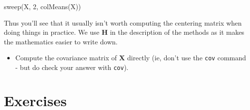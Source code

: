 \documentclass[
]{book}
\newenvironment{Shaded}{\begin{snugshade}}{\end{snugshade}}
\newcommand{\DecValTok}[1]{\textcolor[rgb]{0.00,0.00,0.81}{#1}}
\newcommand{\FunctionTok}[1]{\textcolor[rgb]{0.00,0.00,0.00}{#1}}
\newcommand{\NormalTok}[1]{#1}
\providecommand{\tightlist}{%
  \setlength{\itemsep}{0pt}\setlength{\parskip}{0pt}}
\theoremstyle{definition}
\theoremstyle{definition}
\theoremstyle{definition}
\theoremstyle{definition}
\theoremstyle{remark}
\begin{document}
\begin{Shaded}
\begin{Highlighting}[]
\FunctionTok{sweep}\NormalTok{(X, }\DecValTok{2}\NormalTok{, }\FunctionTok{colMeans}\NormalTok{(X))}
\end{Highlighting}
\end{Shaded}

Thus you'll see that it usually isn't worth computing the centering matrix when doing things in practice. We use \(\mathbf H\) in the description of the methods as it makes the mathematics easier to write down.

\begin{itemize}
\tightlist
\item
  Compute the covariance matrix of \(\mathbf X\) directly (ie, don't use the \texttt{cov} command - but do check your answer with \texttt{cov}).
\end{itemize}

\hypertarget{exercises-ch2}{%
\section{Exercises}\label{exercises-ch2}}
\end{document}
